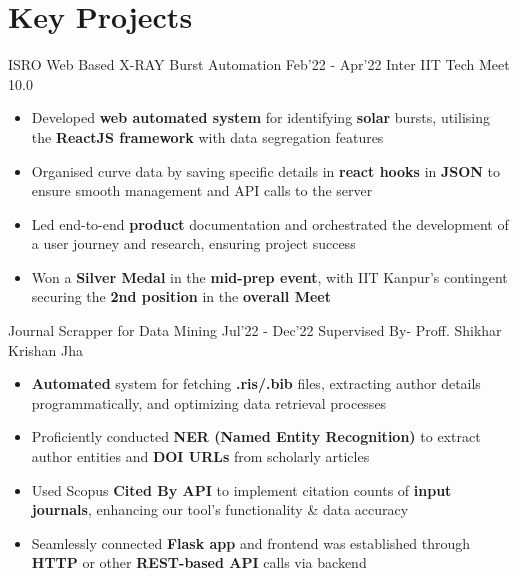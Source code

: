 \section*{\sc Key Projects}
\vspace{-2mm}
\hrulefill
\vspace{1mm}

\excventry
{ISRO Web Based X-RAY Burst Automation}
{Feb'22 - Apr'22}
{\href{https://docs.google.com/presentation/d/10pvkgxBG-ETi1jD3QRtYjZ6shZK6lnJaGWVreLN3-80/edit?usp=sharing}{\faBook} Inter IIT Tech Meet 10.0}
{
  \begin{itemize}
    \item  Developed \textbf{web automated system} for identifying \textbf{solar} bursts, utilising the \textbf{ReactJS framework} with data segregation features
    \item Organised curve data by saving specific details in \textbf{react hooks} in \textbf{JSON} to ensure smooth management and API calls to the server
    \item Led end-to-end \textbf{product} documentation and orchestrated the development of a user journey and research, ensuring project success
    \item Won a \textbf{Silver Medal} in the \textbf{mid-prep event}, with IIT Kanpur’s contingent securing the \textbf{2nd position} in the \textbf{overall Meet}
  \end{itemize}
}

\excventry
{Journal Scrapper for Data Mining}
{Jul'22 - Dec'22}
{Supervised By- Proff. Shikhar Krishan Jha }
{
  \begin{itemize}
    \item \textbf{Automated} system for fetching \textbf{.ris/.bib} files, extracting author details programmatically, and optimizing data retrieval processes
    \item Proficiently conducted \textbf{NER (Named Entity Recognition)} to extract author entities and \textbf{DOI URLs} from scholarly articles
    \item Used Scopus \textbf{Cited By API} to implement citation counts of \textbf{input journals}, enhancing our tool’s functionality \& data accuracy
    \item Seamlessly connected \textbf{Flask app} and frontend was established through \textbf{HTTP} or other \textbf{REST-based API} calls via backend
  \end{itemize}
}

